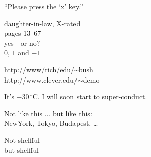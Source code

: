 \documentclass{article}
\begin{document}
    ``Please press the `x' key.''

    daughter-in-law, X-rated\\
    pages 13--67\\
    yes---or no?\\
    $0$, $1$ and $-1$

    http://www/rich/edu/\~{}bush \\
    http://www.clever.edu/$\sim$demo

    It's $-30\,^{\circ}\mathrm{C}$.
    I will soon start to super-conduct.

    \texteuro

    Not like this ... but like 
    this:\\ NewYork, Tokyo, Budapest, \ldots

    Not shelfful\\
    but shelf\mbox{}ful %
    
\end{document}
